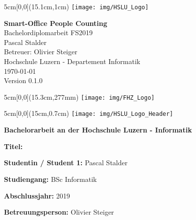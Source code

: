 \begin{titlepage}
	\begin{textblock*}{5cm}[0,0](15.1cm,1cm)
		\texttt{[image: img/HSLU\_Logo]}
	\end{textblock*}
	\begin{center}
		\vspace*{5cm}
		\Huge{\textbf{Smart-Office People Counting}} \\
		\vspace{0.5em}
		\Large{Bachelordiplomarbeit FS2019}\\
		\vspace{3em}
		\LARGE{Pascal Stalder}\\
		\vspace{1em}
		\Large{Betreuer: Olivier Steiger}\\
		\vfill
		\large{Hochschule Luzern - Departement Informatik}\\
		\large{\today}\\
		\large{Version 0.1.0}
	\end{center}
	\begin{textblock*}{5cm}[0,0](15.3cm,277mm)
		\texttt{[image: img/FHZ\_Logo]}
	\end{textblock*}
\end{titlepage}

\newpage


\begin{textblock*}{5cm}[0,0](15cm,0.7cm)
	\texttt{[image: img/HSLU\_Logo\_Header]}
\end{textblock*}

\vspace*{1.35cm}

\noindent
\textbf{\Large{Bachelorarbeit an der Hochschule Luzern - Informatik}}

\vspace{0.6cm}
\noindent
\textbf{Titel:}

\vspace{0.6cm}
\noindent
\textbf{Studentin / Student 1:} Pascal Stalder

\vspace{1cm}
\noindent
\textbf{Studiengang:} BSc Informatik

\vspace{0.6cm}
\noindent
\textbf{Abschlussjahr:} 2019

\vspace{0.6cm}
\noindent
\textbf{Betreuungsperson:} Olivier Steiger

